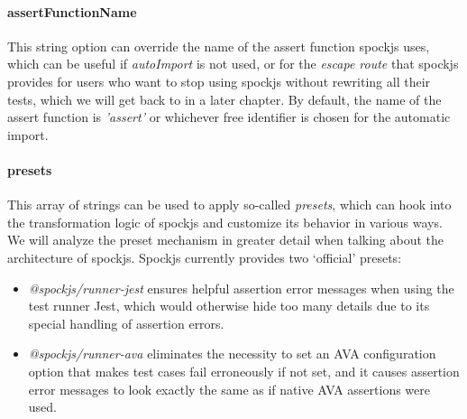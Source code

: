 \paragraph{assertFunctionName}
This string option can override the name of the assert function spockjs uses,
which can be useful if \textit{autoImport} is not used,
or for the \textit{escape route} that spockjs provides
for users who want to stop using spockjs without rewriting all their tests,
which we will get back to in a later chapter.
By default, the name of the assert function is \textit{'assert'}
or whichever free identifier is chosen for the automatic import.

\paragraph{presets}
This array of strings can be used to apply so-called \textit{presets},
which can hook into the transformation logic of spockjs
and customize its behavior in various ways.
We will analyze the preset mechanism in greater detail
when talking about the architecture of spockjs.
Spockjs currently provides two `official' presets:
\begin{itemize}
  \item \textit{@spockjs/runner-jest} ensures helpful assertion error messages
    when using the test runner Jest, \autocite{JestGithub}
    which would otherwise hide too many details
    due to its special handling of assertion errors.
  \item \textit{@spockjs/runner-ava} eliminates the necessity to
    set an AVA \autocite{AvaGithub} configuration option
    that makes test cases fail erroneously if not set,
    and it causes assertion error messages to look
    exactly the same as if native AVA assertions were used.
\end{itemize}
